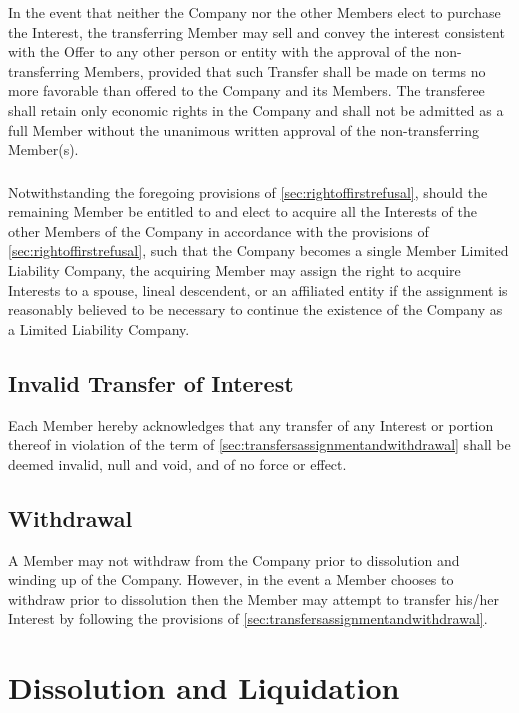\documentclass[11pt,onecolumn]{article}
\begin{document}
In the event that neither the Company nor the other Members elect to purchase the Interest, the transferring Member may sell and convey the interest consistent with the Offer to any other person or entity with the approval of the non-transferring Members, provided that such Transfer shall be made on terms no more favorable than offered to the Company and its Members. The transferee shall retain only economic rights in the Company and shall not be admitted as a full Member without the unanimous written approval of the non-transferring Member(s).

\subsubsection{}

Notwithstanding the foregoing provisions of \autoref{sec:rightoffirstrefusal}, should the remaining Member be entitled to and elect to acquire all the Interests of the other Members of the Company in accordance with the provisions of \autoref{sec:rightoffirstrefusal}, such that the Company becomes a single Member Limited Liability Company, the acquiring Member may assign the right to acquire Interests to a spouse, lineal descendent, or an affiliated entity if the assignment is reasonably believed to be necessary to continue the existence of the Company as a Limited Liability Company.

\subsection{Invalid Transfer of Interest}

Each Member hereby acknowledges that any transfer of any Interest or portion thereof in violation of the term of \autoref{sec:transfersassignmentandwithdrawal} shall be deemed invalid, null and void, and of no force or effect.

\subsection{Withdrawal} \label{sec:withdrawal}

A Member may not withdraw from the Company prior to dissolution and winding up of the Company. However, in the event a Member chooses to withdraw prior to dissolution then the Member may attempt to transfer his/her Interest by following the provisions of \autoref{sec:transfersassignmentandwithdrawal}.

\section{Dissolution and Liquidation} \label{sec:dissolutionandliquidation}
\end{document}
